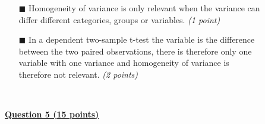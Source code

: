 \begin{itemize}
        \begin{itemize}
        \item[$\blacksquare$] Homogeneity of variance is only relevant when the variance can \\differ different categories, groups or variables. \textit{(1 point)}
        \item[$\blacksquare$] In a dependent two-sample t-test the variable is the difference \\between the two paired observations, there is therefore only one \\variable with one variance and homogeneity of variance is \\therefore not relevant. \textit{(2 points)}
        \end{itemize} \\
\end{itemize}

\underline{\textbf{Question 5 (15 points)}} \\

